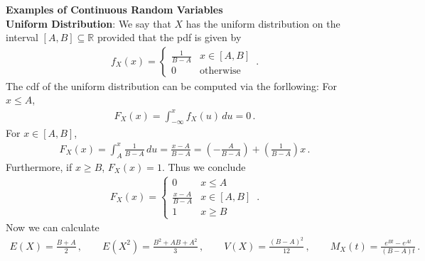 \documentclass[11pt,oneside]{book}
\theoremstyle{newStyle}
\newcommand{\R}{\mathbb{R}}
\begin{document}

\textbf{Examples of Continuous Random Variables}\\

\textbf{Uniform Distribution}:
We say that $X$ has the uniform distribution on the interval $[A,B]\subseteq \R$ provided that the pdf is given by 
\begin{align*}
f_X(x) = \begin{cases}
\frac{1}{B-A} & x \in [A,B]\\
0 & \text{otherwise}
\end{cases}\,.
\end{align*}
The cdf of the uniform distribution can be computed via the forllowing: For $x \leq A$,
\begin{align*}
F_X(x) = \int_{-\infty}^x f_X(u) \, du = 0\,.
\end{align*}
For $x \in [A,B]$, 
\begin{align*}
F_X(x) = \int_A^x \frac{1}{B-A}\, du = \frac{x-A}{B-A} = \left(- \frac{A}{B-A}\right) + \left( \frac{1}{B-A}\right) x\,.
\end{align*}
Furthermore, if $x\geq B$, $F_X(x) = 1$. Thus we conclude
\begin{align*}
F_X(x) = \begin{cases} 0 & x\leq A \\ \frac{x-A}{B-A} & x\in [A,B] \\ 1 & x \geq B
\end{cases}
\,.
\end{align*}
Now we can calculate
\begin{align*}
E(X) = \frac{B+A}{2}\,,\qquad
E(X^2) = \frac{B^2 + AB +A^2}{3} \,,\qquad
V(X) = \frac{(B-A)^2}{12}\,,\qquad
M_X(t) = \frac{e^{Bt}-e^{At}}{(B-A)t}\,.
\end{align*}
\hfill\break
\hfill\break
\end{document}
